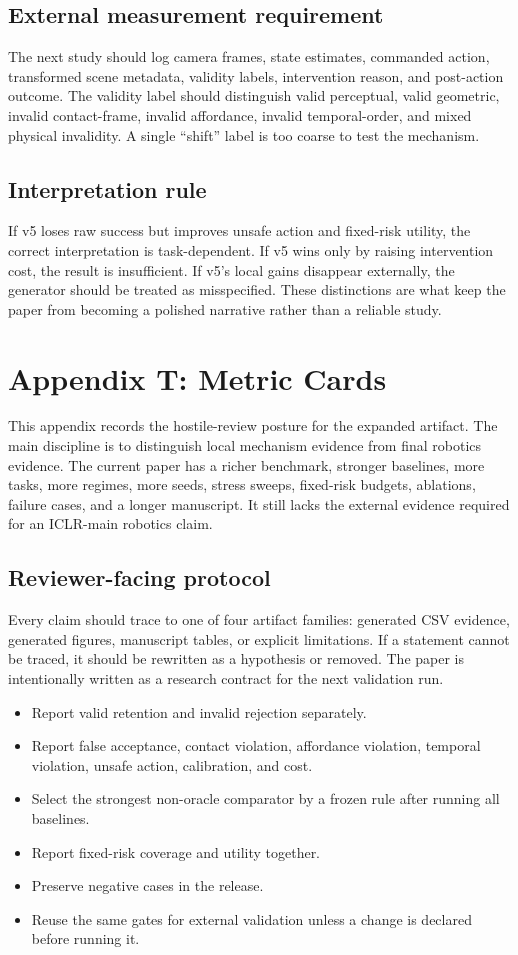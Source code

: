 \documentclass{article}
\begin{document}
\subsection{External measurement requirement}
The next study should log camera frames, state estimates, commanded action, transformed scene metadata, validity labels, intervention reason, and post-action outcome. The validity label should distinguish valid perceptual, valid geometric, invalid contact-frame, invalid affordance, invalid temporal-order, and mixed physical invalidity. A single ``shift'' label is too coarse to test the mechanism.

\subsection{Interpretation rule}
If v5 loses raw success but improves unsafe action and fixed-risk utility, the correct interpretation is task-dependent. If v5 wins only by raising intervention cost, the result is insufficient. If v5's local gains disappear externally, the generator should be treated as misspecified. These distinctions are what keep the paper from becoming a polished narrative rather than a reliable study.


\section{Appendix T: Metric Cards}
This appendix records the hostile-review posture for the expanded artifact. The main discipline is to distinguish local mechanism evidence from final robotics evidence. The current paper has a richer benchmark, stronger baselines, more tasks, more regimes, more seeds, stress sweeps, fixed-risk budgets, ablations, failure cases, and a longer manuscript. It still lacks the external evidence required for an ICLR-main robotics claim.

\subsection{Reviewer-facing protocol}
Every claim should trace to one of four artifact families: generated CSV evidence, generated figures, manuscript tables, or explicit limitations. If a statement cannot be traced, it should be rewritten as a hypothesis or removed. The paper is intentionally written as a research contract for the next validation run.

\begin{itemize}
\item Report valid retention and invalid rejection separately.
\item Report false acceptance, contact violation, affordance violation, temporal violation, unsafe action, calibration, and cost.
\item Select the strongest non-oracle comparator by a frozen rule after running all baselines.
\item Report fixed-risk coverage and utility together.
\item Preserve negative cases in the release.
\item Reuse the same gates for external validation unless a change is declared before running it.
\end{itemize}
\end{document}
